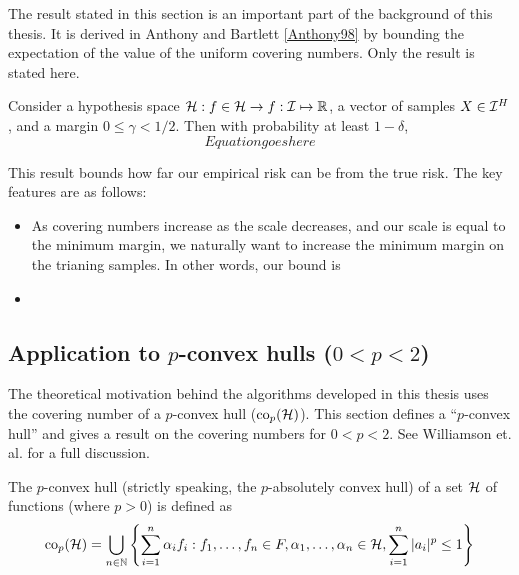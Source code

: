 The result stated in this section is an important part of the
background of this thesis.  It is derived in Anthony and Bartlett
\ref{Anthony98} by bounding the expectation of the value of the
uniform covering numbers.  Only the result is stated here.

\begin{theorem}
Consider a hypothesis space $\mathcal{H} : f \in \mathcal{H} \rightarrow f : \mathcal{I}
\mapsto \mathbb{R}$, a vector of samples $X \in \mathcal{I}^H$, and a margin
$0 \leq \gamma < 1/2$.  Then with probability at least $1 - \delta$, 
\begin{equation}
Equation goes here
\end{equation}
\end{theorem}

This result bounds how far our empirical risk can be from the true
risk.  The key features are as follows:
\begin{itemize}
\item	As covering numbers increase as the scale decreases, and our
	scale is equal to the minimum margin, we naturally want to
	increase the minimum margin on the trianing samples.  In other
	words, our bound is 
\item	
\end{itemize}


\subsection{Application to $p$-convex hulls ($0 < p < 2$)}
\label{sec:p-convex}

The theoretical motivation behind the algorithms developed in this
thesis uses the covering number of a $p$-convex hull ($\mathrm{co}_p(\mathcal{H})$).
This section defines a ``$p$-convex hull'' and gives a result on the covering
numbers for $0 < p < 2$.  See Williamson et. al. \cite{Williamson99}
for a full discussion.

\begin{definition}
The $p$-convex hull (strictly speaking, the $p$-absolutely convex hull) of
a set $\mathcal{H}$ of functions (where $p>0$) is defined as
%
\begin{equation}
\mathrm{co}_p (\mathcal{H}) =
 \bigcup _{n \in \mathbb{N}}
\left\{
 \sum_{i=1}^{n}
 \alpha _i
f_i : f_1, \ldots, f_n \in F,
 \alpha _1, \ldots, \alpha _n \in \mathbb{\mathcal{H}},
 \sum_{i=1}^{n} | a_i |^p \leq 1
\right\}
\end{equation}
\end{definition}


